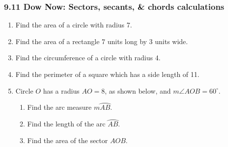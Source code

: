 \documentclass[12pt, twoside]{article}
\begin{document}
\subsubsection*{9.11 Dow Now: Sectors, secants, \& chords calculations}
 \begin{enumerate}

   \item Find the area of a circle with radius 7. \vspace{1.5cm}
   \item Find the area of a rectangle 7 units long by 3 units wide. \vspace{1.5cm}
   \item Find the circumference of a circle with radius 4. \vspace{1.5cm}
   \item Find the perimeter of a square which has a side length of 11. \vspace{1.5cm}

   \item Circle $O$ has a radius $AO=8$, as shown below, and $m\angle AOB=60^\circ$.
         \begin{center}
       \end{center}
       \begin{enumerate}
         \item Find the arc measure $m \wideparen{AB}$. \vspace{1.5cm}
         \item Find the length of the arc $\wideparen{AB}$. \vspace{1.5cm}
         \item Find the area of the sector $AOB$. %
       \end{enumerate}

\newpage


\end{enumerate}
\end{document}
